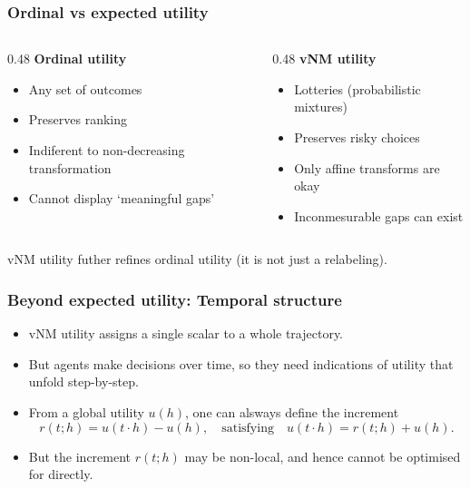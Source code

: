 \documentclass[10pt,a4paper]{beamer}
\begin{document}
\begin{frame}
\frametitle{Ordinal vs expected utility}
\begin{columns}
\begin{column}{0.48\textwidth}
\textbf{Ordinal utility}
\begin{itemize}
    \item Any set of outcomes
    \item Preserves ranking
    \item Indiferent to non-decreasing transformation
    \item Cannot display `meaningful gaps'
\end{itemize}
\end{column}
\begin{column}{0.48\textwidth}
\textbf{vNM utility}
\begin{itemize}
    \item Lotteries (probabilistic mixtures)
    \item Preserves risky choices
    \item Only affine transforms are okay
    \item Inconmesurable gaps can exist
\end{itemize}
\end{column}
\end{columns}

\pause
\vspace{0.4cm}
\centering
vNM utility futher refines ordinal utility (it is not just a relabeling).
\end{frame}



\begin{frame}
\frametitle{Beyond expected utility: Temporal structure}
\begin{itemize}
    \item vNM utility assigns a single scalar to a whole trajectory.
    \pause
    \item But agents make decisions over time, so they need indications of utility that unfold step-by-step.
    \pause
    \item From a global utility $u(h)$, one can alsways define the increment
    $$
    r(t;h)=u(t\cdot h)-u(h),\quad\text{satisfying}\quad u(t\cdot h)=r(t;h)+u(h).
    $$
    \begin{center}
    \end{center}
    \pause
    \item But the increment $r(t;h)$ may be non-local, and hence cannot be optimised for directly.
\end{itemize}
\end{frame}
\end{document}
